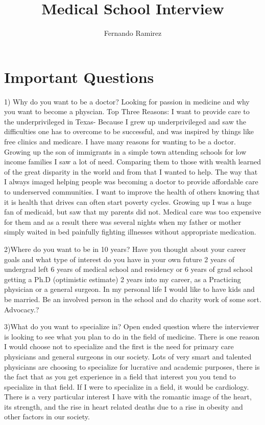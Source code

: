 \documentclass[12pt,a4paper,article]{memoir} %
\title{Medical School Interview}
\author{Fernando Ramirez}
\date{} %
\begin{document}
\maketitle
\tableofcontents* %

\chapter{Important Questions}
1) Why do you want to be a doctor? Looking for passion in medicine and why you want to become a physcian.
Top Three Reasons:
	I want to provide care to the underprivileged in Texas- Because I grew up underprivileged and saw the difficulties one has to overcome to be successful, and was inspired by things like free clinics and medicare.
I have many reasons for wanting to be a doctor.  Growing up the son of immigrants in a simple town attending schools for low income families I saw a lot of need.  Comparing them to those with wealth learned of the great disparity in the world and from that I wanted to help.  The way that I always imaged helping people was becoming a doctor to provide affordable care to underserved communities.  
I want to improve the health of others knowing that it is health that drives can often start poverty cycles. Growing up I was a huge fan of medicaid, but saw that my parents did not.  Medical care was too expensive for them and as a result there was several nights when my father or mother simply waited in bed painfully fighting illnesses without appropriate medication.

2)Where do you want to be in 10 years?  Have you thought about your career goals and what type of interest do  you have in your own future
2 years of undergrad left
6 years of medical school and residency or 6 years of grad school getting a Ph.D (optimistic estimate)
2 years into my career, as a Practicing physician or a general surgeon.
In my personal life I would like to have kids and be married.  Be an involved person in the school and do charity work of some sort. Advocacy.?

3)What do you want to specialize in? Open ended question where the interviewer is looking to see what you plan to do in the field of medicine.
There is one reason I would choose not to specialize and the first is the need for primary care physicians and general surgeons in our society.  Lots of very smart and talented physicians are choosing to specialize for lucrative and academic purposes, there is the fact that as you get experience in a field that interest you you tend to specialize in that field.  If I were to specialize in a field, it would be cardiology.  There is a very particular interest I have with the romantic image of the heart, its strength, and the rise in heart related deaths due to a rise in obesity and other factors in our society.
\end{document}
